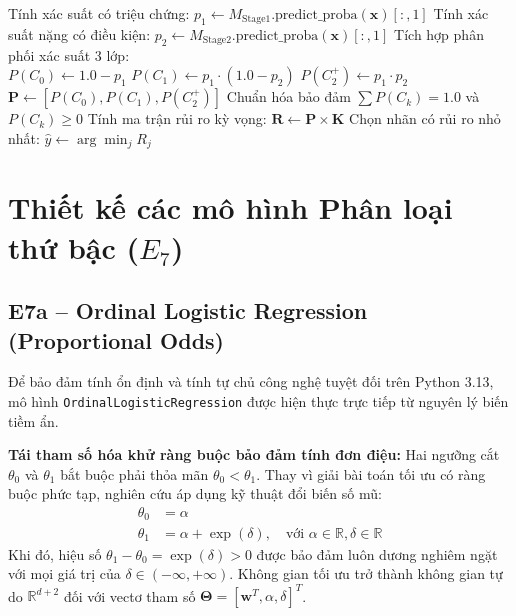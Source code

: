 \begin{algorithm}[h!]
\SetAlgoLined
{}
Tính xác suất có triệu chứng: $p_1 \leftarrow M_{\text{Stage1}}.\text{predict\_proba}(\mathbf{x})[:, 1]$\;
Tính xác suất nặng có điều kiện: $p_2 \leftarrow M_{\text{Stage2}}.\text{predict\_proba}(\mathbf{x})[:, 1]$\;
Tích hợp phân phối xác suất 3 lớp:\\
$P(C_0) \leftarrow 1.0 - p_1$\;
$P(C_1) \leftarrow p_1 \cdot (1.0 - p_2)$\;
$P(C_2^+) \leftarrow p_1 \cdot p_2$\;
$\mathbf{P} \leftarrow [P(C_0), P(C_1), P(C_2^+)]$\;
Chuẩn hóa bảo đảm $\sum P(C_k) = 1.0$ và $P(C_k) \ge 0$\;
Tính ma trận rủi ro kỳ vọng: $\mathbf{R} \leftarrow \mathbf{P} \times \mathbf{K}$\;
Chọn nhãn có rủi ro nhỏ nhất: $\hat{y} \leftarrow \arg\min_j R_j$\;
\;
\caption{Quy trình suy diễn xác suất mềm và quyết định nhạy chi phí ($E_6$)}
\label{algo:soft-cost-sensitive}
\end{algorithm}

\section{Thiết kế các mô hình Phân loại thứ bậc ($E_7$)}
\label{sec:thiet-ke-ordinal}

\subsection{E7a – Ordinal Logistic Regression (Proportional Odds)}
Để bảo đảm tính ổn định và tính tự chủ công nghệ tuyệt đối trên Python 3.13, mô hình \texttt{OrdinalLogisticRegression} được hiện thực trực tiếp từ nguyên lý biến tiềm ẩn. 

\textbf{Tái tham số hóa khử ràng buộc bảo đảm tính đơn điệu:}
Hai ngưỡng cắt $\theta_0$ và $\theta_1$ bắt buộc phải thỏa mãn $\theta_0 < \theta_1$. Thay vì giải bài toán tối ưu có ràng buộc phức tạp, nghiên cứu áp dụng kỹ thuật đổi biến số mũ:
\begin{align}
    \theta_0 &= \alpha \\
    \theta_1 &= \alpha + \exp(\delta), \quad \text{với } \alpha \in \mathbb{R}, \delta \in \mathbb{R}
\end{align}
Khi đó, hiệu số $\theta_1 - \theta_0 = \exp(\delta) > 0$ được bảo đảm luôn dương nghiêm ngặt với mọi giá trị của $\delta \in (-\infty, +\infty)$. Không gian tối ưu trở thành không gian tự do $\mathbb{R}^{d+2}$ đối với vectơ tham số $\mathbf{\Theta} = [\mathbf{w}^T, \alpha, \delta]^T$.

